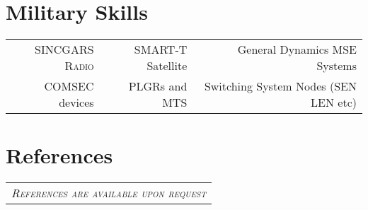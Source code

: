 \documentclass[a4paper,10pt]{article}
\newcommand{\fivenotes}{%
\textcolor{noteone}{\symbol{"2022}}
\textcolor{notetwo}{\symbol{"2022}}
\textcolor{notethree}{\symbol{"2022}}
\textcolor{notefour}{\symbol{"2022}}
\textcolor{notefive}{\symbol{"2022}}
}
\newcommand{\fournotes}{%
\textcolor{noteone}{\symbol{"2022}}
\textcolor{notetwo}{\symbol{"2022}}
\textcolor{notethree}{\symbol{"2022}}
\textcolor{notefour}{\symbol{"2022}}
\textcolor{white}{\symbol{"2022}}
}
\newcommand{\threenotes}{%
\textcolor{noteone}{\symbol{"2022}}
\textcolor{notetwo}{\symbol{"2022}}
\textcolor{notethree}{\symbol{"2022}}
\textcolor{white}{\symbol{"2022}}
\textcolor{white}{\symbol{"2022}}
}
\begin{document}
\section{\textbf{Military Skills}}
\begin{tabular}{r|r|r }
  \textsc{SINCGARS Radio}\small\emph{\fivenotes} &
  SMART-T Satellite \small\emph{\fournotes} &
  General Dynamics MSE Systems\small\emph{\fournotes} \\
  COMSEC devices\small\emph{\fournotes} &
  PLGRs and MTS \small\emph{\threenotes} &
  Switching System Nodes (SEN LEN etc) \small\emph{\threenotes}
\end{tabular}



\section{\textbf{References}}
\begin{tabular}{p{15.5cm}}
  \textsc{\emph{References are available upon request}}
\end{tabular}
\end{document}
